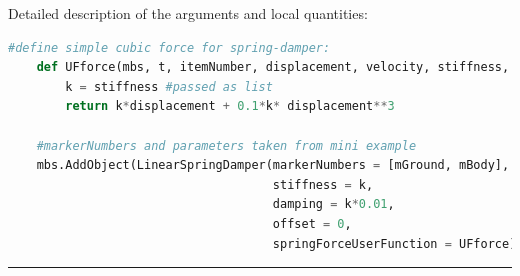 	Detailed description of the arguments and local quantities:
    \finishTable
    \userFunctionExample{}
    \pythonstyle
    \begin{lstlisting}[language=Python]
    #define simple cubic force for spring-damper:
    def UFforce(mbs, t, itemNumber, displacement, velocity, stiffness, damping, offset): 
        k = stiffness #passed as list
        return k*displacement + 0.1*k* displacement**3
    
    #markerNumbers and parameters taken from mini example
    mbs.AddObject(LinearSpringDamper(markerNumbers = [mGround, mBody], 
                                     stiffness = k, 
                                     damping = k*0.01, 
                                     offset = 0,
                                     springForceUserFunction = UFforce))
    \end{lstlisting}
\vspace{6pt}\par\noindent\rule{\textwidth}{0.4pt}
\label{miniExample_ObjectConnectorLinearSpringDamper}
\pythonstyle
